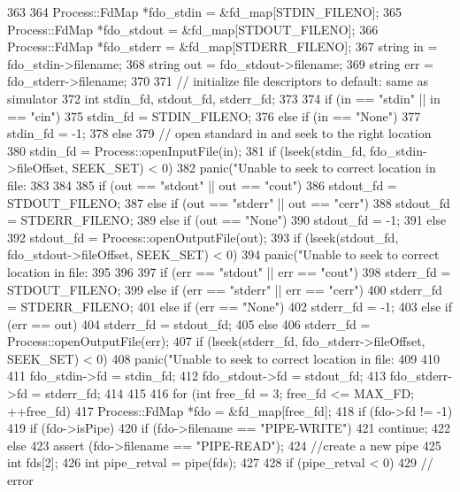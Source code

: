 \begin{DoxyCode}
363 {
364     Process::FdMap *fdo_stdin = &fd_map[STDIN_FILENO];
365     Process::FdMap *fdo_stdout = &fd_map[STDOUT_FILENO];
366     Process::FdMap *fdo_stderr = &fd_map[STDERR_FILENO];
367     string in = fdo_stdin->filename;
368     string out = fdo_stdout->filename;
369     string err = fdo_stderr->filename;
370 
371     // initialize file descriptors to default: same as simulator
372     int stdin_fd, stdout_fd, stderr_fd;
373 
374     if (in == "stdin" || in == "cin")
375         stdin_fd = STDIN_FILENO;
376     else if (in == "None")
377         stdin_fd = -1;
378     else {
379         // open standard in and seek to the right location
380         stdin_fd = Process::openInputFile(in);
381         if (lseek(stdin_fd, fdo_stdin->fileOffset, SEEK_SET) < 0)
382             panic("Unable to seek to correct location in file: %
383     }
384 
385     if (out == "stdout" || out == "cout")
386         stdout_fd = STDOUT_FILENO;
387     else if (out == "stderr" || out == "cerr")
388         stdout_fd = STDERR_FILENO;
389     else if (out == "None")
390         stdout_fd = -1;
391     else {
392         stdout_fd = Process::openOutputFile(out);
393         if (lseek(stdout_fd, fdo_stdout->fileOffset, SEEK_SET) < 0)
394             panic("Unable to seek to correct location in file: %
395     }
396 
397     if (err == "stdout" || err == "cout")
398         stderr_fd = STDOUT_FILENO;
399     else if (err == "stderr" || err == "cerr")
400         stderr_fd = STDERR_FILENO;
401     else if (err == "None")
402         stderr_fd = -1;
403     else if (err == out)
404         stderr_fd = stdout_fd;
405     else {
406         stderr_fd = Process::openOutputFile(err);
407         if (lseek(stderr_fd, fdo_stderr->fileOffset, SEEK_SET) < 0)
408             panic("Unable to seek to correct location in file: %
409     }
410 
411     fdo_stdin->fd = stdin_fd;
412     fdo_stdout->fd = stdout_fd;
413     fdo_stderr->fd = stderr_fd;
414 
415 
416     for (int free_fd = 3; free_fd <= MAX_FD; ++free_fd) {
417         Process::FdMap *fdo = &fd_map[free_fd];
418         if (fdo->fd != -1) {
419             if (fdo->isPipe){
420                 if (fdo->filename == "PIPE-WRITE")
421                     continue;
422                 else {
423                     assert (fdo->filename == "PIPE-READ");
424                     //create a new pipe
425                     int fds[2];
426                     int pipe_retval = pipe(fds);
427 
428                     if (pipe_retval < 0) {
429                         // error
}}}}}}
\end{DoxyCode}
